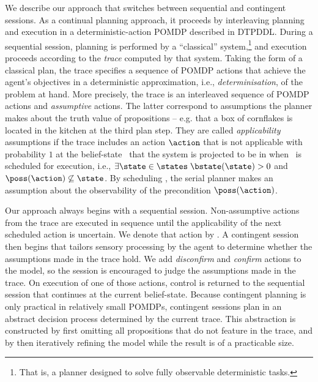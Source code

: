 

We describe our approach that switches between sequential and
contingent sessions. As a continual planning approach, it proceeds by
interleaving planning and execution in a deterministic-action POMDP
described in DTPDDL. During a sequential session, planning is
performed by a ``classical'' system,\footnote{That is, a planner
designed to solve fully observable deterministic tasks.}  and
execution proceeds according to the {\em trace} computed by that
system. Taking the form of a classical plan, the trace specifies a
sequence of POMDP actions that achieve the agent's objectives in a
deterministic approximation, i.e., {\em determinisation}, of the
problem at hand. More precisely, the trace is an interleaved sequence
of POMDP actions and {\em assumptive} actions. The latter correspond
to assumptions the planner makes about the truth value of propositions
-- e.g. that a box of cornflakes is located in the kitchen at the
third plan step. They are called {\em applicability} assumptions if
the trace includes an action $\action$ that is not applicable with
probability $1$ at the belief-state
\bstate\ that the system is projected to be in when \action\ is
scheduled for execution, i.e., $\exists\state\in\states\;
\bstate(\state) > 0$ and $\poss(\action)\not\subseteq\state$. By
scheduling
\action,  the serial planner makes an assumption about the
observability of the precondition $\poss(\action)$.

Our approach always begins with a sequential session. Non-assumptive
actions from the trace are executed in sequence until the
applicability of the next scheduled action is uncertain. We denote
that action by \switchAction.  A contingent session then begins that
tailors sensory processing by the agent to determine whether the
assumptions made in the trace hold. 
We add {\em disconfirm} and {\em confirm} actions to the model, so
the session is encouraged to judge the assumptions made in the
trace. On execution of one of those actions, control is returned to
the sequential session that continues at the current%
belief-state.
Because contingent planning is only practical in relatively small
POMDPs, contingent sessions plan in an abstract decision process
determined by the current trace. This abstraction is constructed by
first omitting all propositions that do not feature in the trace, and
by then iteratively refining the model while the result is of a
practicable size.

